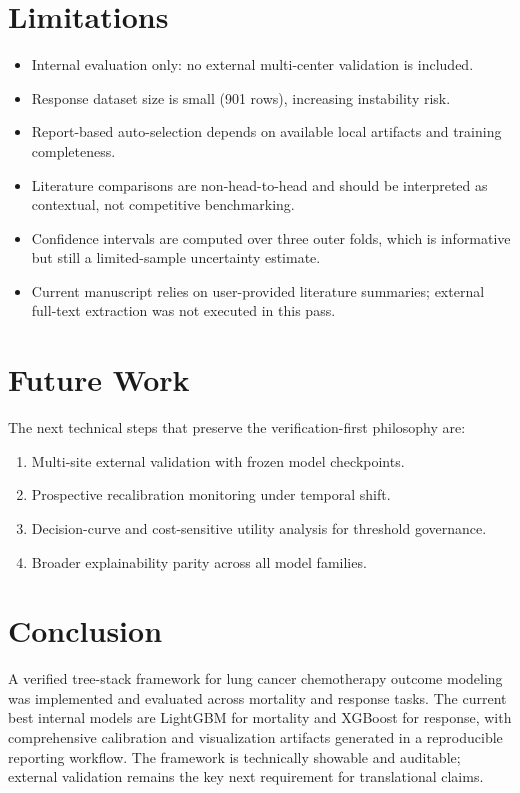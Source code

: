 \documentclass[journal]{IEEEtran}
\begin{document}
\section{Limitations}
\begin{itemize}
    \item Internal evaluation only: no external multi-center validation is included.
    \item Response dataset size is small (901 rows), increasing instability risk.
    \item Report-based auto-selection depends on available local artifacts and training completeness.
    \item Literature comparisons are non-head-to-head and should be interpreted as contextual, not competitive benchmarking.
    \item Confidence intervals are computed over three outer folds, which is informative but still a limited-sample uncertainty estimate.
    \item Current manuscript relies on user-provided literature summaries; external full-text extraction was not executed in this pass.
\end{itemize}

\section{Future Work}
The next technical steps that preserve the verification-first philosophy are:
\begin{enumerate}
    \item Multi-site external validation with frozen model checkpoints.
    \item Prospective recalibration monitoring under temporal shift.
    \item Decision-curve and cost-sensitive utility analysis for threshold governance.
    \item Broader explainability parity across all model families.
\end{enumerate}

\section{Conclusion}
A verified tree-stack framework for lung cancer chemotherapy outcome modeling was implemented and evaluated across mortality and response tasks. The current best internal models are LightGBM for mortality and XGBoost for response, with comprehensive calibration and visualization artifacts generated in a reproducible reporting workflow. The framework is technically showable and auditable; external validation remains the key next requirement for translational claims.
\end{document}
